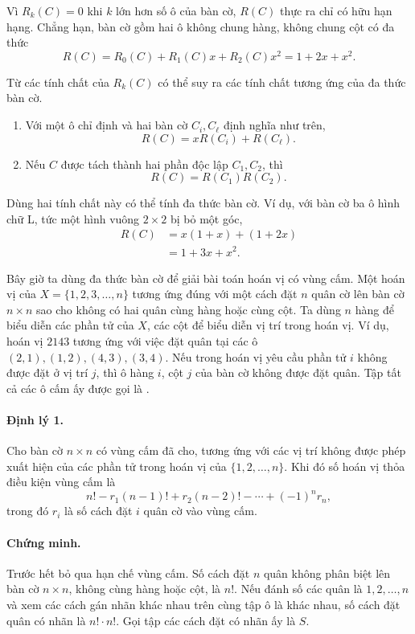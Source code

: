\documentclass[11pt]{article}
\begin{document}
Vì $R_k(C)=0$ khi $k$ lớn hơn số ô của bàn cờ, $R(C)$ thực ra chỉ có hữu hạn
hạng. Chẳng hạn, bàn cờ gồm hai ô không chung hàng, không chung cột có đa thức
\[
  R(C)=R_0(C)+R_1(C)x+R_2(C)x^2=1+2x+x^2.
\]

Từ các tính chất của $R_k(C)$ có thể suy ra các tính chất tương ứng của đa
thức bàn cờ.
\begin{enumerate}
  \item Với một ô chỉ định và hai bàn cờ $C_i,C_\ell$ định nghĩa như trên,
  \[
    R(C)=xR(C_i)+R(C_\ell).
  \]
  \item Nếu $C$ được tách thành hai phần độc lập $C_1,C_2$, thì
  \[
    R(C)=R(C_1)R(C_2).
  \]
\end{enumerate}

Dùng hai tính chất này có thể tính đa thức bàn cờ. Ví dụ, với bàn cờ ba ô
hình chữ L, tức một hình vuông $2\times2$ bị bỏ một góc,
\[
\begin{aligned}
  R(C) &= x(1+x)+(1+2x)\\
       &= 1+3x+x^2.
\end{aligned}
\]

Bây giờ ta dùng đa thức bàn cờ để giải bài toán hoán vị có vùng cấm. Một hoán
vị của $X=\{1,2,3,\ldots,n\}$ tương ứng đúng với một cách đặt $n$ quân cờ lên
bàn cờ $n\times n$ sao cho không có hai quân cùng hàng hoặc cùng cột. Ta dùng
$n$ hàng để biểu diễn các phần tử của $X$, các cột để biểu diễn vị trí trong
hoán vị. Ví dụ, hoán vị $2143$ tương ứng với việc đặt quân tại các ô
$(2,1),(1,2),(4,3),(3,4)$. Nếu trong hoán vị yêu cầu phần tử $i$ không được
đặt ở vị trí $j$, thì ô hàng $i$, cột $j$ của bàn cờ không được đặt quân. Tập
tất cả các ô cấm ấy được gọi là .

\paragraph{Định lý 1.}
Cho bàn cờ $n\times n$ có vùng cấm đã cho, tương ứng với các vị trí không được
phép xuất hiện của các phần tử trong hoán vị của $\{1,2,\ldots,n\}$. Khi đó số
hoán vị thỏa điều kiện vùng cấm là
\[
  n!-r_1(n-1)!+r_2(n-2)!-\cdots+(-1)^nr_n,
\]
trong đó $r_i$ là số cách đặt $i$ quân cờ vào vùng cấm.

\paragraph{Chứng minh.}
Trước hết bỏ qua hạn chế vùng cấm. Số cách đặt $n$ quân không phân biệt lên
bàn cờ $n\times n$, không cùng hàng hoặc cột, là $n!$. Nếu đánh số các quân
là $1,2,\ldots,n$ và xem các cách gán nhãn khác nhau trên cùng tập ô là khác
nhau, số cách đặt quân có nhãn là $n!\cdot n!$. Gọi tập các cách đặt có nhãn
ấy là $S$.
\end{document}
